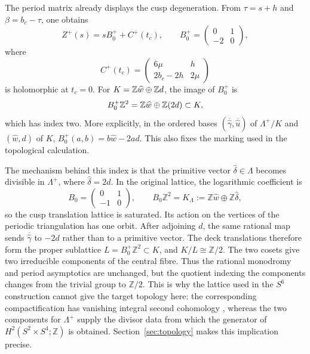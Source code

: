 The period matrix already displays the cusp degeneration.  From
$\tau=s+h$ and $\beta=b_c-\tau$, one obtains
\begin{equation}\label{eq:an-cusp-period-splitting}
 Z^+(s)=sB_0^++C^+(t_c),
 \qquad
 B_0^+=
 \begin{pmatrix}0&1\\-2&0\end{pmatrix},
\end{equation}
where
\begin{equation}\label{eq:an-cusp-C}
 C^+(t_c)=
 \begin{pmatrix}
 6\mu&h\\2b_c-2h&2\mu
 \end{pmatrix}
\end{equation}
is holomorphic at $t_c=0$.  For
$K=\mathbb Z\widehat w\oplus\mathbb Z d$, the image of $B_0^+$ is
\begin{equation}\label{eq:an-index-two-image}
 B_0^+\mathbb Z^2
 =\mathbb Z\widehat w\oplus\mathbb Z(2d)\subset K,
\end{equation}
which has index two.  More explicitly, in the ordered bases
$(\overline{\widehat\gamma},\overline{\widehat u})$ of
$\Lambda^+/K$ and $(\widehat w,d)$ of $K$,
$B_0^+(a,b)=b\widehat w-2ad$.  This also fixes the marking used in the
topological calculation.

The mechanism behind this index is that the primitive vector
$\widehat\delta\in\Lambda$ becomes divisible in $\Lambda^+$, where
$\widehat\delta=2d$.  In the original lattice, the logarithmic coefficient
is
\[
 B_0=\begin{pmatrix}0&1\\-1&0\end{pmatrix},
 \qquad
 B_0\mathbb Z^2
 =K_\Lambda:=\mathbb Z\widehat w\oplus\mathbb Z\widehat\delta,
\]
so the cusp translation lattice is saturated.  Its action on the vertices
of the periodic triangulation has one orbit.  After adjoining $d$, the same
rational map sends $\overline{\widehat\gamma}$ to $-2d$ rather than to a
primitive vector.  The deck translations therefore form the proper
sublattice
$L=B_0^+\mathbb Z^2\subset K$, and
$K/L\cong\mathbb Z/2$.
The two cosets give two irreducible components of the central fibre.  Thus
the rational monodromy and period asymptotics are unchanged, but the quotient
indexing the components changes from the trivial group to $\mathbb Z/2$.
This is why the lattice used in the $S^6$ construction cannot give the
target topology here: the corresponding compactification has
vanishing integral second cohomology \citep{Alpoge2026}, whereas the two
components for $\Lambda^+$ supply the divisor data from which the generator of
$H^2(S^2\times S^4;\mathbb Z)$ is obtained.  Section~\ref{sec:topology}
makes this implication precise.

